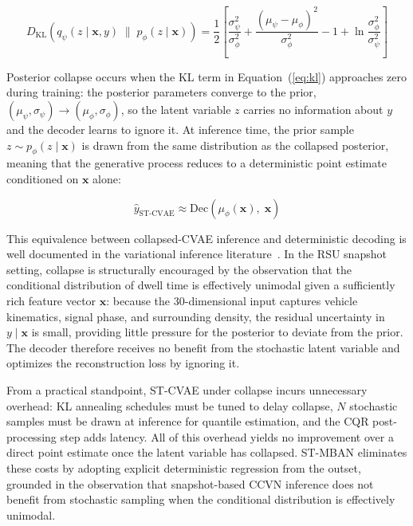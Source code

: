 \documentclass[journal]{IEEEtran}
\begin{document}
\begin{equation}
D_\text{KL}\!\left(q_\psi(z \mid \mathbf{x}, y) \;\|\; p_\phi(z \mid \mathbf{x})\right) = \frac{1}{2}\!\left[\frac{\sigma_\psi^2}{\sigma_\phi^2} + \frac{(\mu_\psi - \mu_\phi)^2}{\sigma_\phi^2} - 1 + \ln\frac{\sigma_\phi^2}{\sigma_\psi^2}\right]
\label{eq:kl}
\end{equation}

Posterior collapse occurs when the KL term in Equation~(\ref{eq:kl}) approaches zero during training: the posterior parameters converge to the prior, $(\mu_\psi, \sigma_\psi) \to (\mu_\phi, \sigma_\phi)$, so the latent variable $z$ carries no information about $y$ and the decoder learns to ignore it.
At inference time, the prior sample $z \sim p_\phi(z \mid \mathbf{x})$ is drawn from the same distribution as the collapsed posterior, meaning that the generative process reduces to a deterministic point estimate conditioned on $\mathbf{x}$ alone:

\begin{equation}
\hat{y}_\text{ST-CVAE} \approx \text{Dec}\!\left(\mu_\phi(\mathbf{x}),\; \mathbf{x}\right)
\label{eq:collapse}
\end{equation}

This equivalence between collapsed-CVAE inference and deterministic decoding is well documented in the variational inference literature~\cite{posteriorCollapse, vandenOord2017}.
In the RSU snapshot setting, collapse is structurally encouraged by the observation that the conditional distribution of dwell time is effectively unimodal given a sufficiently rich feature vector $\mathbf{x}$: because the 30-dimensional input captures vehicle kinematics, signal phase, and surrounding density, the residual uncertainty in $y \mid \mathbf{x}$ is small, providing little pressure for the posterior to deviate from the prior.
The decoder therefore receives no benefit from the stochastic latent variable and optimizes the reconstruction loss by ignoring it.

From a practical standpoint, ST-CVAE under collapse incurs unnecessary overhead: KL annealing schedules must be tuned to delay collapse, $N$ stochastic samples must be drawn at inference for quantile estimation, and the CQR post-processing step adds latency.
All of this overhead yields no improvement over a direct point estimate once the latent variable has collapsed.
ST-MBAN eliminates these costs by adopting explicit deterministic regression from the outset, grounded in the observation that snapshot-based CCVN inference does not benefit from stochastic sampling when the conditional distribution is effectively unimodal.
\end{document}

